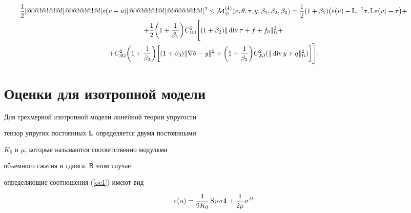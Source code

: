 \begin{gather*}


\frac{1}{2}\norme{\varepsilon(v-u)}^2 \le


{\cal M}^{(4)}_\oplus(v,\theta,\tau,y,\beta_1,\beta_2,\beta_3)=


\frac{1}{2}(1+\beta_1)


\big(\varepsilon(v) -{\Bbb L}^{-1}\tau,


{\Bbb L}\varepsilon(v) - \tau\big)+\\


%


+\frac{1}{2}\bigg(1+\frac{1}{\beta_1}\bigg) C_{1\Omega}^2 \Bigg[


(1+\beta_2)\norm{\Div \tau + f + f_\theta}^2_{\Omega}+ \\


%


+C_{3\Omega}^2 \bigg(1+\frac{1}{\beta_2}\bigg)


\bigg[ (1+\beta_3) \norm{\nabla \theta - y}^2


+ \bigg(1+\frac{1}{\beta_3} \bigg)


C_{2\Omega}^2 (\norm{\Div y + q}^2_{\Omega}


)\bigg]\Bigg].


\end{gather*}








\section{Оценки для изотропной модели}





Для трехмерной изотропной модели линейной теории упругости


тензор упругих постоянных ${\Bbb L}$ определяется двумя постоянными


$K_0$ и $\mu$, которые называются соответственно модулями


объемного сжатия и сдвига. В этом случае


определяющие соотношения (\ref{oe1}) имеют вид


\begin{equation*}


\varepsilon (u)=\frac{1}{9 K_0}\SP\sigma {\bold 1}


+ \frac{1}{2\mu} \sigma^D


\end{equation*}


